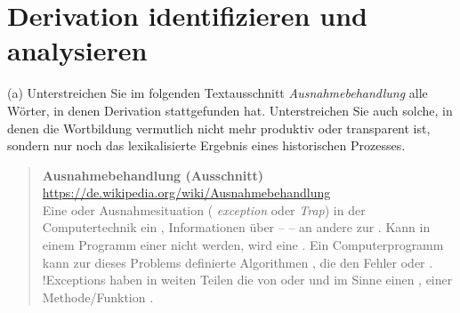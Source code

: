 \section{Derivation identifizieren und analysieren}

(a) Unterstreichen Sie im folgenden Textausschnitt \textit{Ausnahmebehandlung} alle Wörter, in denen Derivation stattgefunden hat.
Unterstreichen Sie auch solche, in denen die Wortbildung vermutlich nicht mehr produktiv oder transparent ist, sondern nur noch das lexikalisierte Ergebnis eines historischen Prozesses.

 \begin{quote}\onehalfspacing
   \textbf{Ausnahmebehandlung (Ausschnitt)}\\
   {\footnotesize\url{https://de.wikipedia.org/wiki/Ausnahmebehandlung}}\\

   Eine  oder Ausnahmesituation ( \textit{exception} oder \textit{Trap})  in der Computertechnik ein , Informationen über   –   – an andere  zur  .
Kann in einem Programm  einer  nicht  werden, wird eine  . Ein Computerprogramm kann zur  dieses Problems  definierte Algorithmen , die den Fehler  oder .
!Exceptions haben in weiten Teilen die  von    oder   und  im  Sinne einen ,   einer Methode\slash Funktion .
 \end{quote}

